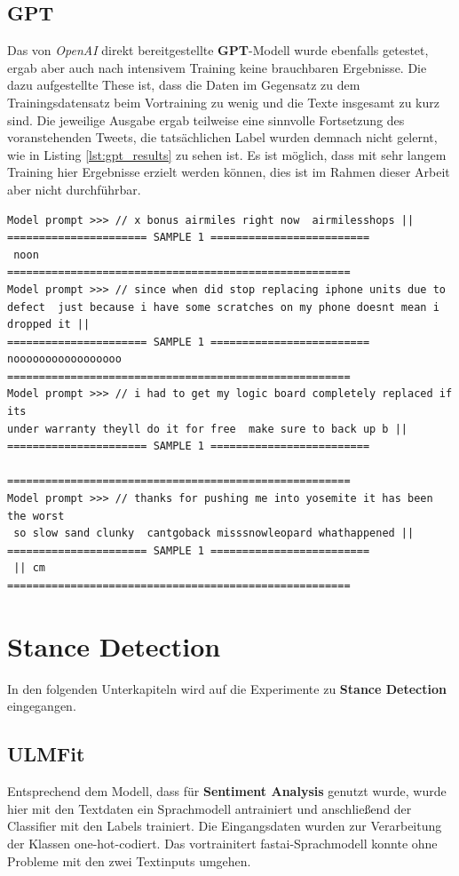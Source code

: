 \subsection{GPT}
Das von \textit{OpenAI} direkt bereitgestellte \textbf{GPT}-Modell wurde ebenfalls getestet, ergab aber auch nach intensivem Training keine brauchbaren Ergebnisse. Die dazu aufgestellte These ist, dass die Daten im Gegensatz zu dem Trainingsdatensatz beim Vortraining zu wenig und die Texte insgesamt zu kurz sind. Die jeweilige Ausgabe ergab teilweise eine sinnvolle Fortsetzung des voranstehenden Tweets, die tats\"achlichen Label wurden demnach nicht gelernt, wie in Listing \ref{lst:gpt_results} zu sehen ist. Es ist m\"oglich, dass mit sehr langem Training hier Ergebnisse erzielt werden k\"onnen, dies ist im Rahmen dieser Arbeit aber nicht durchf\"uhrbar.
\lstset{language=Python}
\lstset{frame=lines}
\lstset{captionpos=b}
\lstset{basicstyle=\footnotesize}
\begin{lstlisting}
Model prompt >>> // x bonus airmiles right now  airmilesshops ||
====================== SAMPLE 1 =========================
 noon 
======================================================
Model prompt >>> // since when did stop replacing iphone units due to defect  just because i have some scratches on my phone doesnt mean i dropped it ||
====================== SAMPLE 1 =========================
nooooooooooooooooo
======================================================
Model prompt >>> // i had to get my logic board completely replaced if its 
under warranty theyll do it for free  make sure to back up b ||
====================== SAMPLE 1 =========================
  
======================================================
Model prompt >>> // thanks for pushing me into yosemite it has been the worst
 so slow sand clunky  cantgoback misssnowleopard whathappened ||
====================== SAMPLE 1 =========================
 || cm
======================================================
\end{lstlisting}

\section{Stance Detection}
In den folgenden Unterkapiteln wird auf die Experimente zu \textbf{Stance Detection} eingegangen.

\subsection{ULMFit}
Entsprechend dem Modell, dass f\"ur \textbf{Sentiment Analysis} genutzt wurde, wurde hier mit den Textdaten ein Sprachmodell antrainiert und anschlie{\ss}end der Classifier mit den Labels trainiert. Die Eingangsdaten wurden zur Verarbeitung der Klassen one-hot-codiert. Das vortrainitert fastai-Sprachmodell konnte ohne Probleme mit den zwei Textinputs umgehen.

